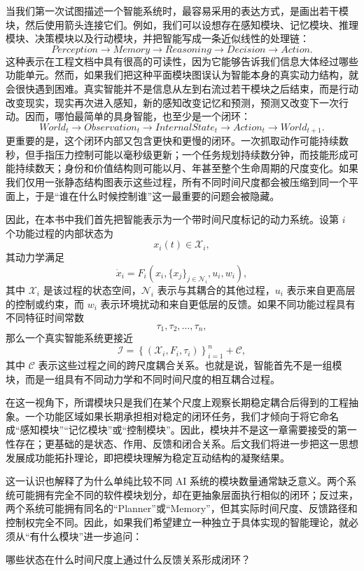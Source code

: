 当我们第一次试图描述一个智能系统时，最容易采用的表达方式，是画出若干模块，然后使用箭头连接它们。例如，我们可以设想存在感知模块、记忆模块、推理模块、决策模块以及行动模块，并把智能写成一条近似线性的处理链：
\[
Perception
\rightarrow
Memory
\rightarrow
Reasoning
\rightarrow
Decision
\rightarrow
Action.
\]
这种表示在工程文档中具有很高的可读性，因为它能够告诉我们信息大体经过哪些功能单元。然而，如果我们把这种平面模块图误认为智能本身的真实动力结构，就会很快遇到困难。真实智能并不是信息从左到右流过若干模块之后结束，而是行动改变现实，现实再次进入感知，新的感知改变记忆和预测，预测又改变下一次行动。因而，哪怕最简单的具身智能，也至少是一个闭环：
\[
World_t
\rightarrow
Observation_t
\rightarrow
InternalState_t
\rightarrow
Action_t
\rightarrow
World_{t+1}.
\]
更重要的是，这个闭环内部又包含更快和更慢的闭环。一次抓取动作可能持续数秒，但手指压力控制可能以毫秒级更新；一个任务规划持续数分钟，而技能形成可能持续数天；身份和价值结构则可能以月、年甚至整个生命周期的尺度变化。如果我们仅用一张静态结构图表示这些过程，所有不同时间尺度都会被压缩到同一个平面上，于是“谁在什么时候控制谁”这一最重要的问题会被隐藏。

因此，在本书中我们首先把智能表示为一个带时间尺度标记的动力系统。设第 $i$ 个功能过程的内部状态为
\[
x_i(t)\in\mathcal{X}_i,
\]
其动力学满足
\[
\dot{x}_i
=
F_i
\left(
x_i,
\{x_j\}_{j\in\mathcal{N}_i},
u_i,
w_i
\right),
\]
其中 $\mathcal{X}_i$ 是该过程的状态空间，$\mathcal{N}_i$ 表示与其耦合的其他过程，$u_i$ 表示来自更高层的控制或约束，而 $w_i$ 表示环境扰动和来自更低层的反馈。如果不同功能过程具有不同特征时间常数
\[
\tau_1,\tau_2,\ldots,\tau_n,
\]
那么一个真实智能系统更接近
\[
\boxed{
\mathcal{I}
=
\left\{
(\mathcal{X}_i,F_i,\tau_i)
\right\}_{i=1}^{n}
+
\mathcal{C},
}
\]
其中 $\mathcal{C}$ 表示这些过程之间的跨尺度耦合关系。也就是说，智能首先不是一组模块，而是一组具有不同动力学和不同时间尺度的相互耦合过程。

在这一视角下，所谓模块只是我们在某个尺度上观察长期稳定耦合后得到的工程抽象。一个功能区域如果长期承担相对稳定的闭环任务，我们才倾向于将它命名成“感知模块”“记忆模块”或“控制模块”。因此，模块并不是这一章需要接受的第一性存在；更基础的是状态、作用、反馈和闭合关系。后文我们将进一步把这一思想发展成功能拓扑理论，即把模块理解为稳定互动结构的凝聚结果。

这一认识也解释了为什么单纯比较不同 AI 系统的模块数量通常缺乏意义。两个系统可能拥有完全不同的软件模块划分，却在更抽象层面执行相似的闭环；反过来，两个系统可能拥有同名的“Planner”或“Memory”，但其实际时间尺度、反馈路径和控制权完全不同。因此，如果我们希望建立一种独立于具体实现的智能理论，就必须从“有什么模块”进一步追问：
\begin{statementbox}
哪些状态在什么时间尺度上通过什么反馈关系形成闭环？
\end{statementbox}

